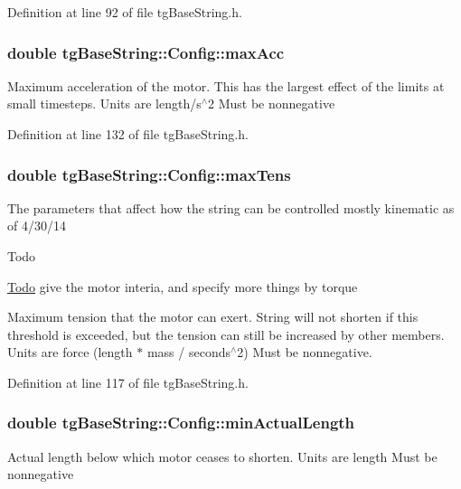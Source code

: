 Definition at line 92 of file tg\-Base\-String.\-h.

\hypertarget{structtg_base_string_1_1_config_aefa59fa6c9a4ea484249ab757632f6cc}{
\subsubsection[{max\-Acc}]{\setlength{\rightskip}{0pt plus 5cm}double tg\-Base\-String\-::\-Config\-::max\-Acc}}\label{structtg_base_string_1_1_config_aefa59fa6c9a4ea484249ab757632f6cc}
Maximum acceleration of the motor. This has the largest effect of the limits at small timesteps. Units are length/s$^\wedge$2 Must be nonnegative 

Definition at line 132 of file tg\-Base\-String.\-h.

\hypertarget{structtg_base_string_1_1_config_a0db6cb3d545d501cd40f2d24545e91e8}{
\subsubsection[{max\-Tens}]{\setlength{\rightskip}{0pt plus 5cm}double tg\-Base\-String\-::\-Config\-::max\-Tens}}\label{structtg_base_string_1_1_config_a0db6cb3d545d501cd40f2d24545e91e8}
The parameters that affect how the string can be controlled mostly kinematic as of 4/30/14 \begin{DoxyRefDesc}{Todo}
\item[\hyperlink{todo__todo000009}{Todo}]give the motor interia, and specify more things by torque \end{DoxyRefDesc}
Maximum tension that the motor can exert. String will not shorten if this threshold is exceeded, but the tension can still be increased by other members. Units are force (length $\ast$ mass / seconds$^\wedge$2) Must be nonnegative. 

Definition at line 117 of file tg\-Base\-String.\-h.

\hypertarget{structtg_base_string_1_1_config_afda46419afa830031e2a9935d73a75dc}{
\subsubsection[{min\-Actual\-Length}]{\setlength{\rightskip}{0pt plus 5cm}double tg\-Base\-String\-::\-Config\-::min\-Actual\-Length}}\label{structtg_base_string_1_1_config_afda46419afa830031e2a9935d73a75dc}
Actual length below which motor ceases to shorten. Units are length Must be nonnegative 

